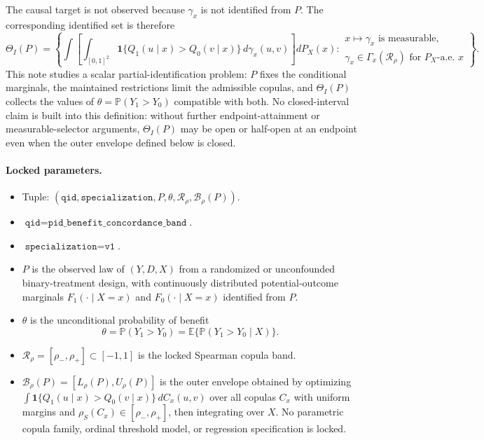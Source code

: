 \documentclass[11pt]{article}
\newcommand{\E}{\mathbb{E}}
\renewcommand{\Pr}{\mathbb{P}}
\newcommand{\one}{\mathbf{1}}
\theoremstyle{definition}
\theoremstyle{plain}
\theoremstyle{remark}
\begin{document}
The causal target is not observed because \(\gamma_x\) is not identified from \(P\).  The corresponding identified set is therefore
\[
\Theta_I(P)=\left\{\int \left[\int_{[0,1]^2}\one\{Q_1(u\mid x)>Q_0(v\mid x)\}\,d\gamma_x(u,v)\right] dP_X(x):
\begin{array}{l}
x\mapsto\gamma_x\text{ is measurable,}\\
\gamma_x\in\Gamma_x(\mathcal R_\rho)\text{ for }P_X\text{-a.e. }x
\end{array}
\right\}.
\]
This note studies a scalar partial-identification problem: \(P\) fixes the conditional marginals, the maintained restrictions limit the admissible copulas, and \(\Theta_I(P)\) collects the values of \(\theta=\Pr(Y_1>Y_0)\) compatible with both.  No closed-interval claim is built into this definition: without further endpoint-attainment or measurable-selector arguments, \(\Theta_I(P)\) may be open or half-open at an endpoint even when the outer envelope defined below is closed.

\paragraph{Locked parameters.}
\begin{itemize}[leftmargin=*]
\item Tuple: \((\texttt{qid},\texttt{specialization},P,\theta,\mathcal R_{\rho},\mathcal B_{\rho}(P))\).
\item \(\texttt{qid}=\texttt{pid\_benefit\_concordance\_band}\).
\item \(\texttt{specialization}=\texttt{v1}\).
\item \(P\) is the observed law of \((Y,D,X)\) from a randomized or unconfounded binary-treatment design, with continuously distributed potential-outcome marginals \(F_1(\cdot\mid X=x)\) and \(F_0(\cdot\mid X=x)\) identified from \(P\).
\item \(\theta\) is the unconditional probability of benefit
\[
\theta=\Pr(Y_1>Y_0)=\E\{\Pr(Y_1>Y_0\mid X)\}.
\]
\item \(\mathcal R_{\rho}=[\rho_-,\rho_+]\subset[-1,1]\) is the locked Spearman copula band.
\item \(\mathcal B_{\rho}(P)=[L_{\rho}(P),U_{\rho}(P)]\) is the outer envelope obtained by optimizing \(\int \one\{Q_1(u\mid x)>Q_0(v\mid x)\}\,dC_x(u,v)\) over all copulas \(C_x\) with uniform margins and \(\rho_S(C_x)\in[\rho_-,\rho_+]\), then integrating over \(X\).  No parametric copula family, ordinal threshold model, or regression specification is locked.
\end{itemize}
\end{document}

